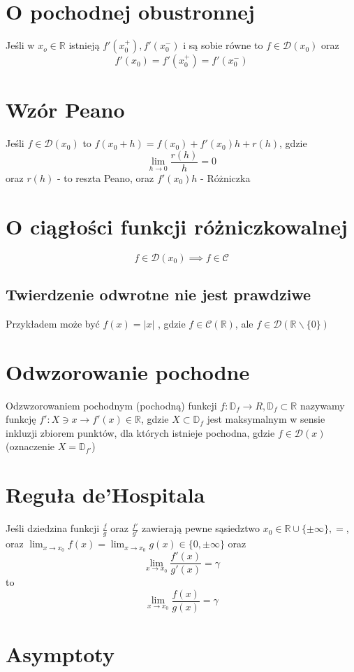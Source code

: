 \documentclass[11pt]{article}
\begin{document}
\section{O pochodnej obustronnej}
Jeśli w $x_o \in \mathbb{R}$ istnieją $f'(x_0^+),f'(x_0^-)$ i są sobie równe to $f \in \mathcal{D}(x_0)$ oraz $$ f'(x_0) = f'(x_0^+) = f'(x_0^-) $$
\section{Wzór Peano}
Jeśli $f \in \mathcal{D}(x_0)$ to $f(x_0 + h) = f(x_0) + f'(x_0)h + r(h)$, gdzie $$ \lim_{h \to 0}{\frac{r(h)}{h}} = 0$$
oraz $r(h)$ - to reszta Peano, oraz $f'(x_0)h$ - Różniczka

\section{O ciągłości funkcji różniczkowalnej}
$$ f \in \mathcal{D}(x_0) \implies f \in \mathcal{C} $$
\subsection{Twierdzenie odwrotne nie jest prawdziwe}
Przykładem może być $f(x) = |x|$ , gdzie $ f \in \mathcal{C}(\mathbb{R})$, ale $ f \in \mathcal{D}(\mathbb{R} \backslash \{ 0 \})$

\section{Odwzorowanie pochodne}
Odzwzorowaniem pochodnym (pochodną) funkcji $f : \mathbb{D}_f \to R, \mathbb{D}_f \subset \mathbb{R}$ nazywamy funkcję $f' : X \ni x \to f'(x) \in \mathbb{R}$, gdzie $ X \subset \mathbb{D}_f$ jest maksymalnym w sensie inkluzji zbiorem punktów, dla których istnieje pochodna, gdzie $f \in \mathcal{D}(x)$ (oznaczenie $ X = \mathbb{D}_{f'}$)

\section{Reguła de'Hospitala}
Jeśli dziedzina funkcji $\frac{f}{g}$ oraz $\frac{f'}{g'}$ zawierają pewne sąsiedztwo $ x_0 \in \mathbb{R} 
\cup \{ \pm \infty \},=$, oraz $\lim_{x \to x_0}{f(x)} = \lim_{x \to x_0}{g(x)} \in \{ 0 ,\pm \infty \}$ oraz $$ \lim_{x \to x_0}{\frac{f'(x)}{g'(x)}} = \gamma $$ to $$\lim_{x \to x_0}{\frac{f(x)}{g(x)}} = \gamma $$

\section{Asymptoty}
\end{document}
